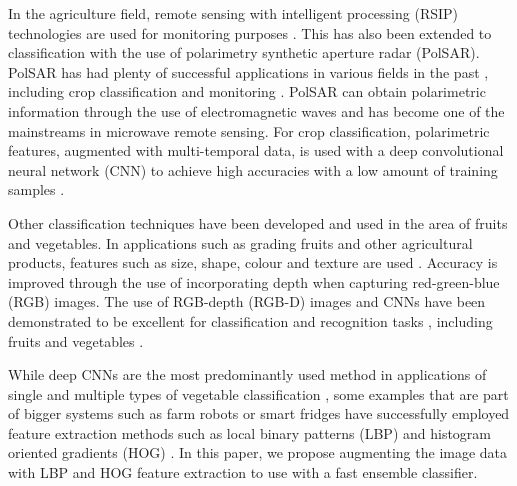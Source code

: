 In the agriculture field, remote sensing with intelligent processing (RSIP) technologies are used for monitoring purposes \cite{b2_1}. This has also been extended to classification with the use of polarimetry synthetic aperture radar (PolSAR). PolSAR has had plenty of successful applications in various fields in the past \cite{b2_2,b2_3,b2_4}, including crop classification and monitoring \cite{b2_5,b2_6}. PolSAR can obtain polarimetric information through the use of electromagnetic waves and has become one of the mainstreams in microwave remote sensing. For crop classification, polarimetric features, augmented with multi-temporal data, is used with a deep convolutional neural network (CNN) to achieve high accuracies with a low amount of training samples \cite{b2_7}.

Other classification techniques have been developed and used in the area of fruits and vegetables. In applications such as grading fruits and other agricultural products, features such as size, shape, colour and texture are used \cite{b2_8,b2_9,b2_10}. Accuracy is improved through the use of incorporating depth when capturing red-green-blue (RGB) images. The use of RGB-depth (RGB-D) images and CNNs have been demonstrated to be excellent for classification and recognition tasks \cite{b2_11,b2_12}, including fruits and vegetables \cite{b2_13}.

While deep CNNs are the most predominantly used method in applications of single and multiple types of vegetable classification \cite{b2_14,b2_15,b2_16}, some examples that are part of bigger systems such as farm robots \cite{b2_17} or smart fridges \cite{b2_18} have successfully employed feature extraction methods such as local binary patterns (LBP) and histogram oriented gradients (HOG) \cite{b2_19,b2_20}. In this paper, we propose augmenting the image data with LBP and HOG feature extraction to use with a fast ensemble classifier.
